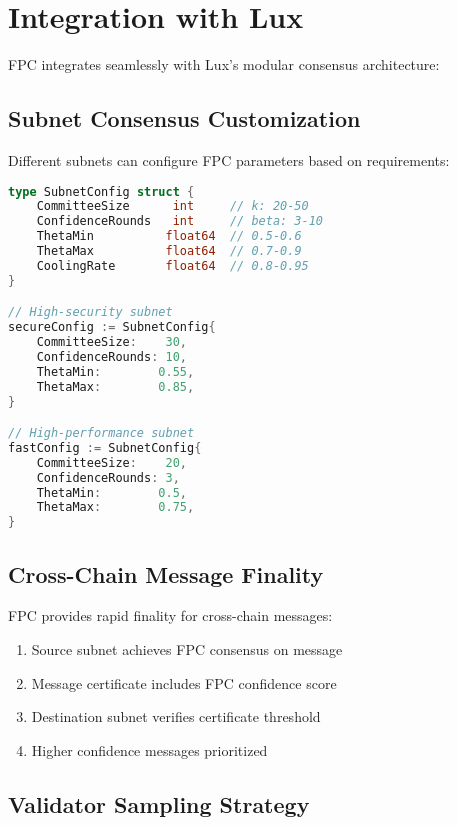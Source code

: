 \documentclass[11pt,a4paper]{article}
\begin{document}
\section{Integration with Lux}
\label{sec:integration}

FPC integrates seamlessly with Lux's modular consensus architecture:

\subsection{Subnet Consensus Customization}

Different subnets can configure FPC parameters based on requirements:

\begin{lstlisting}[language=Go, caption=Subnet-specific FPC configuration]
type SubnetConfig struct {
    CommitteeSize      int     // k: 20-50
    ConfidenceRounds   int     // beta: 3-10
    ThetaMin          float64  // 0.5-0.6
    ThetaMax          float64  // 0.7-0.9
    CoolingRate       float64  // 0.8-0.95
}

// High-security subnet
secureConfig := SubnetConfig{
    CommitteeSize:    30,
    ConfidenceRounds: 10,
    ThetaMin:        0.55,
    ThetaMax:        0.85,
}

// High-performance subnet  
fastConfig := SubnetConfig{
    CommitteeSize:    20,
    ConfidenceRounds: 3,
    ThetaMin:        0.5,
    ThetaMax:        0.75,
}
\end{lstlisting}

\subsection{Cross-Chain Message Finality}

FPC provides rapid finality for cross-chain messages:

\begin{enumerate}
\item Source subnet achieves FPC consensus on message
\item Message certificate includes FPC confidence score
\item Destination subnet verifies certificate threshold
\item Higher confidence messages prioritized
\end{enumerate}

\subsection{Validator Sampling Strategy}
\end{document}
